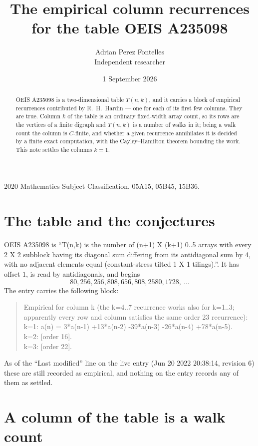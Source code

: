 \documentclass[11pt,a4paper]{article}
\title{The empirical column recurrences for the table OEIS A235098}
\author{Adrian Perez Fontelles\\ \small Independent researcher}
\date{1 September 2026}
\theoremstyle{plain}
\theoremstyle{definition}
\begin{document}
\maketitle

\begin{abstract}
OEIS A235098 is a two-dimensional table $T(n,k)$, and it carries a block of empirical
recurrences contributed by R.~H.~Hardin --- one for each of its first few columns. They are
true. Column $k$ of the table is an ordinary fixed-width array count, so its rows are the
vertices of a finite digraph and $T(n,k)$ is a number of walks in it; being a walk count the
column is $C$-finite, and whether a given recurrence annihilates it is decided by a finite
exact computation, with the Cayley--Hamilton theorem bounding the work. This note settles the columns $k=1$.
\end{abstract}

\noindent\small 2020 Mathematics Subject Classification. 05A15, 05B45, 15B36.\normalsize

\section{The table and the conjectures}

OEIS A235098 is ``T(n,k) is the number of (n+1) X (k+1) 0..5 arrays with every 2 X 2 subblock having its diagonal sum differing from its antidiagonal sum by 4, with no adjacent elements equal (constant-stress tilted 1 X 1 tilings).''. It has offset $1$, is
read by antidiagonals, and begins
\[
80, 256, 256, 808, 656, 808, 2580, 1728,\ \dots
\]
The entry carries the following block:
\begin{quote}\small
Empirical for column k (the k=4..7 recurrence works also for k=1..3; apparently every row and column satisfies the same order 23 recurrence):\\
k=1: a(n) = 3*a(n-1) +13*a(n-2) -39*a(n-3) -26*a(n-4) +78*a(n-5).\\
k=2: [order 16].\\
k=3: [order 22].\\
\end{quote}
As of the ``Last modified'' line on the live entry (Jun 20 2022 20:38:14, revision 6) these are still
recorded as empirical, and nothing on the entry records any of them as settled.

\section{A column of the table is a walk count}
\end{document}
